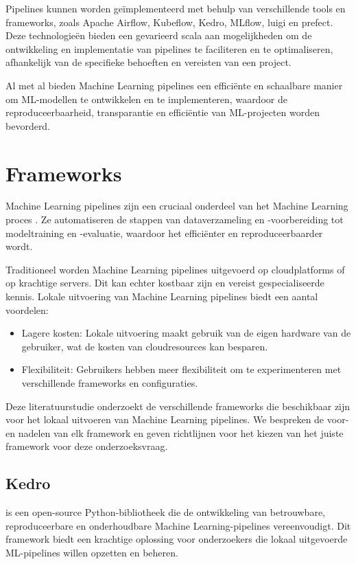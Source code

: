 Pipelines kunnen worden geïmplementeerd met behulp van verschillende tools en frameworks, zoals Apache Airflow, Kubeflow, Kedro, MLflow, luigi en prefect. Deze technologieën bieden een gevarieerd scala aan mogelijkheden om de ontwikkeling en implementatie van pipelines te faciliteren en te optimaliseren, afhankelijk van de specifieke behoeften en vereisten van een project.

Al met al bieden Machine Learning pipelines een efficiënte en schaalbare manier om ML-modellen te ontwikkelen en te implementeren, waardoor de reproduceerbaarheid, transparantie en efficiëntie van ML-projecten worden bevorderd.

\section{Frameworks}

Machine Learning pipelines zijn een cruciaal onderdeel van het Machine Learning proces \autocite{Jordan2015}. Ze automatiseren de stappen van dataverzameling en -voorbereiding tot modeltraining en -evaluatie, waardoor het efficiënter en reproduceerbaarder wordt.

Traditioneel worden Machine Learning pipelines uitgevoerd op cloudplatforms of op krachtige servers. Dit kan echter kostbaar zijn en vereist gespecialiseerde kennis. Lokale uitvoering van Machine Learning pipelines biedt een aantal voordelen:

\begin{itemize}
  \item Lagere kosten: Lokale uitvoering maakt gebruik van de eigen hardware van de gebruiker, wat de kosten van cloudresources kan besparen.
  \item Flexibiliteit: Gebruikers hebben meer flexibiliteit om te experimenteren met verschillende frameworks en configuraties.
\end{itemize}

Deze literatuurstudie onderzoekt de verschillende frameworks die beschikbaar zijn voor het lokaal uitvoeren van Machine Learning pipelines. We bespreken de voor- en nadelen van elk framework en geven richtlijnen voor het kiezen van het juiste framework voor deze onderzoeksvraag.
\subsection{Kedro}
\autocite{Kedro2024} is een open-source Python-bibliotheek die de ontwikkeling van betrouwbare, reproduceerbare en onderhoudbare Machine Learning-pipelines vereenvoudigt. Dit framework biedt een krachtige oplossing voor onderzoekers die lokaal uitgevoerde ML-pipelines willen opzetten en beheren.

